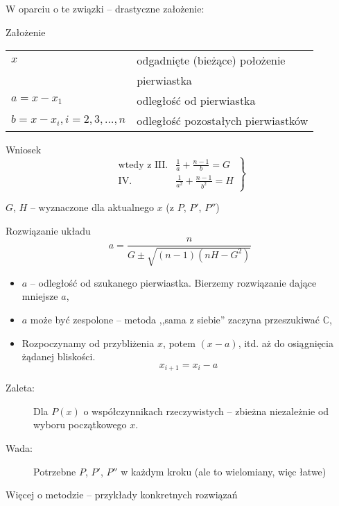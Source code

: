 \begin{frame}
  W oparciu o te związki -- drastyczne założenie:
  \begin{block}{Założenie}
    \begin{tabular}{ll}
      $x$ & odgadnięte (bieżące) położenie \\
      & pierwiastka \\
      $a = x - x_1$ & odległość od pierwiastka \\
      $b = x - x_i, i = 2,3, \dots , n$ & odległość pozostałych pierwiastków
    \end{tabular}
  \end{block}

  \begin{block}{Wniosek}
    $$ \left. \begin{array}{rl}
      \text{wtedy z III.} & \frac{1}{a} + \frac{n - 1}{b} = G \\ %
      \text{IV.} & \frac{1}{a^2} + \frac{n - 1}{b^2} = H
    \end{array} \right\} $$
  \end{block}

$G$, $H$ -- wyznaczone dla aktualnego $x$ (z $P$, $P'$, $P''$)
\end{frame}

\begin{frame}
  \begin{block}{Rozwiązanie układu}
    $$a = \frac{n}{G \pm \sqrt{(n-1)(nH-G^2)}}$$
  \end{block}


  \begin{itemize}
    \item $a$ -- odległość od szukanego pierwiastka. Bierzemy rozwiązanie dające mniejsze $a$,
    \item $a$ może być zespolone -- metoda ,,sama z siebie'' zaczyna przeszukiwać $\mathbb{C}$,
    \item Rozpoczynamy od przybliżenia $x$, potem $(x-a)$, itd. aż do osiągnięcia żądanej bliskości.
    $$x_{i+1}=x_i-a$$
  \end{itemize}
\end{frame}

\begin{frame}
  \begin{block}{}
    \begin{description}
      \item[Zaleta:] Dla $P(x)$ o współczynnikach rzeczywistych -- zbieżna niezależnie od wyboru początkowego $x$.
      \item[Wada:] Potrzebne $P$, $P'$, $P''$ w każdym kroku (ale to wielomiany, więc łatwe)
    \end{description}
  \end{block}

  Więcej o metodzie -- przykłady konkretnych rozwiązań \cite{Adams}
\end{frame}

